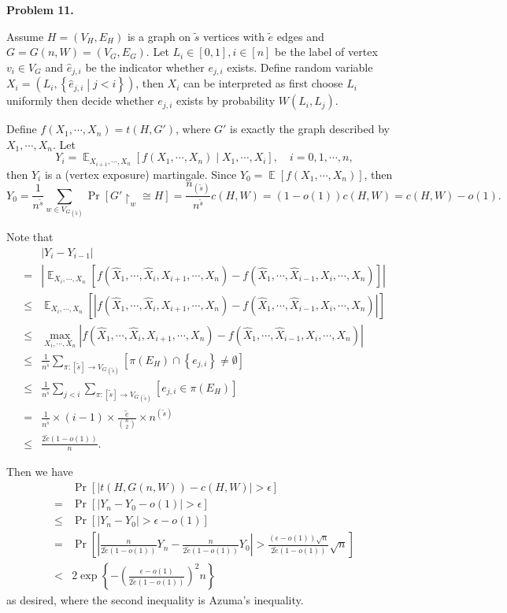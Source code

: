 \documentclass[a4paper]{article}
\newenvironment{problem}[1]{
	\par
	\noindent\textbf{Problem #1.}\quad
}{
	\par
	\bigskip
}
\DeclareMathOperator{\E}{\mathbb E}
\newcommand{\abs}[1]{\left| #1 \right|}
\newcommand{\pbra}[1]{\left( #1 \right)}
\newcommand{\cbra}[1]{\left\{ #1 \right\}}
\newcommand{\sbra}[1]{\left[ #1 \right]}
\begin{document}
\begin{problem}{11}
    Assume $H=(V_H,E_H)$ is a graph on $\tilde s$ vertices with $\tilde e$ edges and $G=G(n,W)=(V_G,E_G)$.
    Let $L_i\in[0,1],i\in[n]$ be the label of vertex $v_i\in V_G$ and
    $\hat e_{j,i}$ be the indicator whether $e_{j,i}$ exists. Define
    random variable $X_i=(L_i,\cbra{\hat e_{j,i}\middle|j<i})$,
    then $X_i$ can be interpreted as first choose $L_i$ uniformly
    then decide whether $e_{j,i}$ exists by probability $W(L_i,L_j)$. 

    Define $f(X_1,\cdots,X_n)=t(H,G')$, where $G'$ is exactly the graph described by $X_1,\cdots,X_n$.
    Let 
    $$
    Y_i=\E_{X_{i+1},\cdots,X_n}\sbra{f(X_1,\cdots,X_n)\middle|X_1,\cdots,X_i},\quad i=0,1,\cdots,n,
    $$
    then $Y_i$ is a (vertex exposure) martingale.
    Since $Y_0=\E\sbra{f(X_1,\cdots,X_n)}$, then 
    $$
    Y_0=\frac1{n^{\tilde s}}\sum_{w\in{V_G}_{(\tilde s)}}\Pr\sbra{G'\restriction_w\cong H}
    =\frac{n_{(\tilde s)}}{n^{\tilde s}}c(H,W)=(1-o(1))c(H,W)=c(H,W)-o(1).
    $$

    Note that 
    \begin{align*}
        &\abs{Y_i-Y_{i-1}}\\
        =&\abs{\E_{X_i,\cdots,X_n}\sbra{f(\hat X_1,\cdots,\hat X_i,X_{i+1},\cdots,X_n)-
        f(\hat X_1,\cdots,\hat X_{i-1},X_i,\cdots,X_n)}}\\
        \leq&\E_{X_i,\cdots,X_n}\sbra{\abs{f(\hat X_1,\cdots,\hat X_i,X_{i+1},\cdots,X_n)-
        f(\hat X_1,\cdots,\hat X_{i-1},X_i,\cdots,X_n)}}\\
        \leq&\max_{X_i,\cdots,X_n}\abs{f(\hat X_1,\cdots,\hat X_i,X_{i+1},\cdots,X_n)-
        f(\hat X_1,\cdots,\hat X_{i-1},X_i,\cdots,X_n)}\\
        \leq&\frac1{n^{\tilde s}}\sum_{\pi:[\tilde s]\to{V_G}_{(\tilde s)}}\sbra{\pi(E_H)\cap\cbra{e_{j,i}}\neq\emptyset}\\
        \leq&\frac1{n^{\tilde s}}\sum_{j<i}\sum_{\pi:[\tilde s]\to{V_G}_{(\tilde s)}}\sbra{e_{j,i}\in\pi(E_H)}\\
        =&\frac1{n^{\tilde s}}\times\pbra{i-1}\times\frac{\tilde e}{\binom n2}\times n^{(\tilde s)}\\
        \leq&\frac{2\tilde e(1-o(1))}n.
    \end{align*}

    Then we have
    \begin{align*}
        &\Pr\sbra{\abs{t(H,G(n,W))-c(H,W)}>\epsilon}\\
        =&\Pr\sbra{\abs{Y_n-Y_0-o(1)}>\epsilon}\\
        \leq&\Pr\sbra{\abs{Y_n-Y_0}>\epsilon-o(1)}\\
        =&\Pr\sbra{\abs{\frac n{2\tilde e(1-o(1))}Y_n-\frac n{2\tilde e(1-o(1))}Y_0}
        >\frac{(\epsilon-o(1))\sqrt n}{2\tilde e(1-o(1))}\sqrt n}\\
        <&2\exp\cbra{-\pbra{\frac{\epsilon-o(1)}{2\tilde e(1-o(1))}}^2n}
    \end{align*}
    as desired, where the second inequality is Azuma's inequality.


\end{problem}
\end{document}
